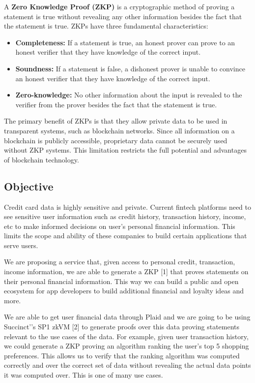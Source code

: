 \documentclass{scrartcl}
\begin{document}
A \textbf{Zero Knowledge Proof (ZKP)} is a cryptographic method of proving a statement is true without revealing any other information besides the fact that the statement is true. ZKPs have three fundamental characteristics:

\begin{itemize}
    \item \textbf{Completeness:} If a statement is true, an honest prover can prove to an honest verifier that they have knowledge of the correct input.
    \item \textbf{Soundness:} If a statement is false, a dishonest prover is unable to convince an honest verifier that they have knowledge of the correct input.
    \item \textbf{Zero-knowledge:} No other information about the input is revealed to the verifier from the prover besides the fact that the statement is true.
\end{itemize}

The primary benefit of ZKPs is that they allow private data to be used in transparent systems, such as blockchain networks. Since all information on a blockchain is publicly accessible, proprietary data cannot be securely used without ZKP systems. This limitation restricts the full potential and advantages of blockchain technology.

\subsection{Objective}

Credit card data is highly sensitive and private. Current fintech platforms need to see sensitive user information such as credit history, transaction history, income, etc to make informed decisions on user’s personal financial information. This limits the scope and ability of these companies to build certain applications that serve users.

We are proposing a service that, given access to personal credit, transaction, income information, we are able to generate a ZKP [1] that proves statements on their personal financial information. This way we can build a public and open ecosystem for app developers to build additional financial and loyalty ideas and more.

We are able to get user financial data through Plaid and we are going to be using Succinct’'s SP1 zkVM [2] to generate proofs over this data proving statements relevant to the use cases of the data. For example, given user transaction history, we could generate a ZKP proving an algorithm ranking the user’s top 5 shopping preferences. This allows us to verify that the ranking algorithm was computed correctly and over the correct set of data without revealing the actual data points it was computed over. This is one of many use cases.
\end{document}
